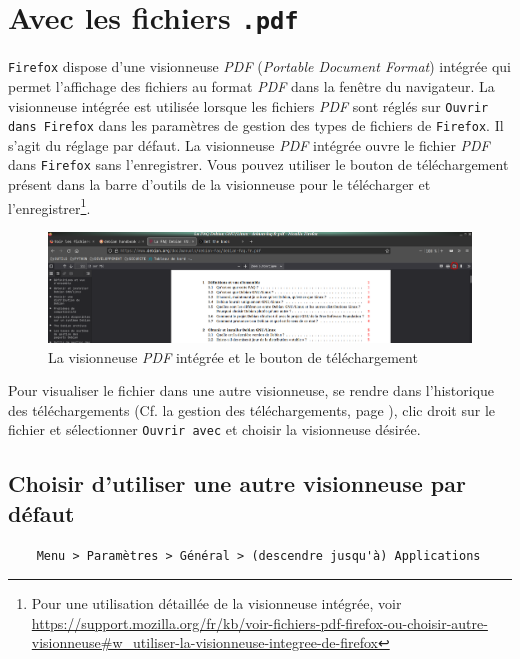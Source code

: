 \documentclass[a4paper,11pt]{book}
\begin{document}
\section{Avec les fichiers \texttt{.pdf}}
\texttt{Firefox} dispose d’une visionneuse \textit{PDF} (\textit{Portable Document Format}) intégrée qui permet l’affichage des fichiers au format \textit{PDF} dans la fenêtre du navigateur. La visionneuse intégrée est utilisée lorsque les fichiers \textit{PDF} sont réglés sur \texttt{Ouvrir dans Firefox} dans les paramètres de gestion des types de fichiers de \texttt{Firefox}. Il s’agit du réglage par défaut. La visionneuse \textit{PDF} intégrée ouvre le fichier \textit{PDF} dans \texttt{Firefox} sans l’enregistrer. Vous pouvez utiliser le bouton de téléchargement présent dans la barre d’outils de la visionneuse pour le télécharger et l’enregistrer\footnote{Pour une utilisation détaillée de la visionneuse intégrée, voir \url{https://support.mozilla.org/fr/kb/voir-fichiers-pdf-firefox-ou-choisir-autre-visionneuse#w_utiliser-la-visionneuse-integree-de-firefox}}.
\begin{figure}[!h]
\begin{center}
\includegraphics[scale=0.2]{IMG/006--Visionneuse_pdf.png}
\caption{La visionneuse \textit{PDF} intégrée et le bouton de téléchargement}
\end{center}
\end{figure}
\medskip

Pour visualiser le fichier dans une autre visionneuse, se  rendre dans l'historique des téléchargements (Cf. la gestion des téléchargements, page \pageref{Telecharge}), clic droit sur le fichier et sélectionner \texttt{Ouvrir avec} et choisir la visionneuse désirée.
\medskip

\subsection*{Choisir d'utiliser une autre visionneuse par défaut}
\begin{verbatim}
    Menu > Paramètres > Général > (descendre jusqu'à) Applications
\end{verbatim}
\medskip
\end{document}
